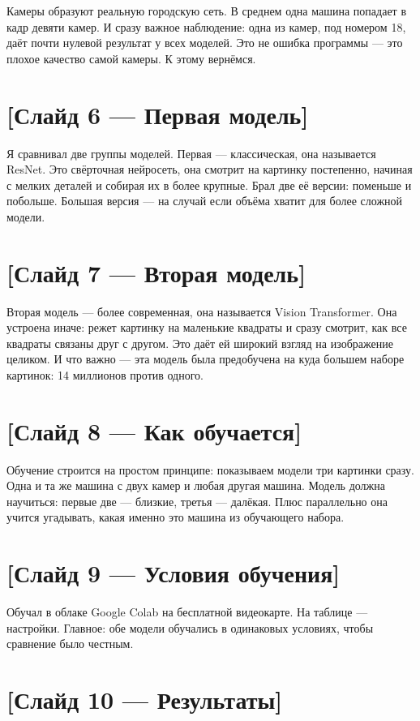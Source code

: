 \documentclass[a4paper,12pt]{article}
\begin{document}
Камеры образуют реальную городскую сеть. В среднем одна машина попадает в кадр девяти камер. И сразу важное наблюдение: одна из камер, под номером 18, даёт почти нулевой результат у всех моделей. Это не ошибка программы — это плохое качество самой камеры. К этому вернёмся.

\section*{[Слайд 6 — Первая модель]}

Я сравнивал две группы моделей. Первая — классическая, она называется ResNet. Это свёрточная нейросеть, она смотрит на картинку постепенно, начиная с мелких деталей и собирая их в более крупные. Брал две её версии: поменьше и побольше. Большая версия — на случай если объёма хватит для более сложной модели.

\section*{[Слайд 7 — Вторая модель]}

Вторая модель — более современная, она называется Vision Transformer. Она устроена иначе: режет картинку на маленькие квадраты и сразу смотрит, как все квадраты связаны друг с другом. Это даёт ей широкий взгляд на изображение целиком. И что важно — эта модель была предобучена на куда большем наборе картинок: 14 миллионов против одного.

\section*{[Слайд 8 — Как обучается]}

Обучение строится на простом принципе: показываем модели три картинки сразу. Одна и та же машина с двух камер и любая другая машина. Модель должна научиться: первые две — близкие, третья — далёкая. Плюс параллельно она учится угадывать, какая именно это машина из обучающего набора.

\section*{[Слайд 9 — Условия обучения]}

Обучал в облаке Google Colab на бесплатной видеокарте. На таблице — настройки. Главное: обе модели обучались в одинаковых условиях, чтобы сравнение было честным.

\section*{[Слайд 10 — Результаты]}
\end{document}
